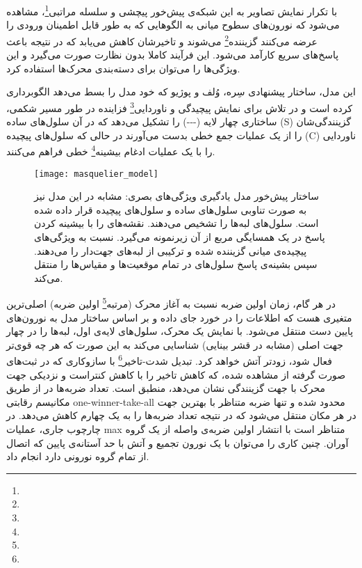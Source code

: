 با تکرار نمایش تصاویر به این شبکه‌ی پیش‌خور پیچشی و سلسله مراتبی\footnote{}، مشاهده می‌شود که نورون‌های سطوح میانی به الگوهایی که به طور قابل اطمینان ورودی را عرضه می‌کنند گزیننده\footnote{} می‌شوند و تاخیرشان کاهش می‌یابد که در نتیجه باعث پاسخ‌های سریع کارآمد می‌شود. این فرآیند کاملا بدون نظارت صورت می‌گیرد و این ویژگی‌ها را می‌توان برای دسته‌بندی محرک‌ها استفاده کرد.

این مدل، ساختار پیشنهادی سِره، وُلف و پوژیو\cite{serre2005object} که خود مدل  را بسط می‌دهد الگوبرداری کرده است و در تلاش برای نمایش پیچیدگی و ناوردایی\footnote{} فزاینده در طور مسیر شکمی، ساختاری چهار لایه (---) را تشکیل می‌دهد که در آن سلول‌های ساده (S) گزینندگی‌شان را از یک عملیات جمع خطی بدست می‌آورند در حالی که سلول‌های پیچیده (C) ناوردایی را با یک عملیات ادغام بیشینه\footnote{ } خطی فراهم می‌کنند. 

\begin{figure}
\centering
{\footnotesize
\texttt{[image: masquelier\_model]}
\caption[ساختار پیش‌خور مدل یادگیری ویژگی‌های بصری]{ساختار پیش‌خور مدل یادگیری ویژگی‌های بصری: مشابه \cite{riesenhuber1999hierarchical} در این مدل نیز به صورت تناوبی سلول‌های ساده و سلول‌های پیچیده قرار داده شده است. سلول‌های  لبه‌ها را تشخیص می‌دهند.  نقشه‌های  را با بیشینه کردن پاسخ در یک همسایگی مربع از آن زیرنمونه می‌گیرد.  نسبت به ویژگی‌های پیچیده‌ی میانی گزیننده شده و ترکیبی از لبه‌های جهت‌دار را می‌دهند. سپس  بشینه‌ی پاسخ سلول‌های  در تمام موقعیت‌ها و مقیاس‌ها را منتقل می‌کند.\cite{masquelier2007unsupervised}}
\label{fig:masquelier_model}
}
\end{figure}

در هر گام، زمان اولین ضربه نسبت به آغاز محرک (مرتبه\footnote{} اولین ضربه) اصلی‌ترین متغیری هست که اطلاعات را در خورد جای داده و بر اساس ساختار مدل به نورون‌های پایین دست منتقل می‌شود. با نمایش یک محرک، سلول‌های  لایه‌ی اول، لبه‌ها را در چهار جهت اصلی (مشابه  در قشر بینایی) شناسایی می‌کند به این صورت که  هر چه قوی‌تر فعال شود، زودتر آتش خواهد کرد. تبدیل شدت-تاخیر\footnote{} با سازوکاری که در ثبت‌های صورت گرفته از  مشاهده شده، که کاهش تاخیر را با کاهش کنتراست\cite{albrecht2002visual} و نزدیکی جهت محرک با جهت گزینندگی نشان می‌دهد\cite{celebrini1993dynamics}، منطبق است. تعداد ضربه‌ها در  از طریق مکانیسم رقابتی one-winner-take-all محدود شده و تنها ضربه متناظر با بهترین جهت در هر مکان منتقل می‌شود که در نتیجه تعداد ضربه‌ها را به یک چهارم کاهش می‌دهد. در چارچوب جاری، عملیات max متناظر است با انتشار اولین ضربه‌ی واصله از یک گروه آوران. چنین کاری را می‌توان با یک نورون تجمیع و آتش با حد آستانه‌ی پایین که اتصال از تمام گروه نورونی دارد انجام داد. 

